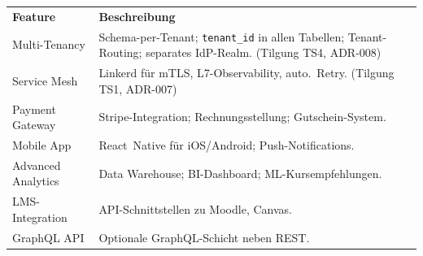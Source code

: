 \begin{tabularx}{\textwidth}{L{3.5cm} X}
  \color{white}\textbf{Feature} & \color{white}\textbf{Beschreibung} \\
  Multi-Tenancy & Schema-per-Tenant; \texttt{tenant\_id} in allen Tabellen; Tenant-Routing; separates IdP-Realm. (Tilgung TS4, ADR-008) \\
  Service Mesh & Linkerd für mTLS, L7-Observability, auto.\ Retry. (Tilgung TS1, ADR-007) \\
  Payment Gateway & Stripe-Integration; Rechnungsstellung; Gutschein-System. \\
  Mobile App & React~Native für iOS/Android; Push-Notifications. \\
  Advanced Analytics & Data Warehouse; BI-Dashboard; ML-Kursempfehlungen. \\
  LMS-Integration & API-Schnittstellen zu Moodle, Canvas. \\
  GraphQL API & Optionale GraphQL-Schicht neben REST. \\
\end{tabularx}